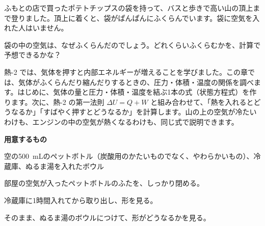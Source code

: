 
\begin{hatena}
\noindent\begin{minipage}[c]{0.58\linewidth}\raggedright
ふもとの店で買ったポテトチップスの袋を持って、バスと歩きで高い山の頂上まで登りました。頂上に着くと、袋がぱんぱんにふくらんでいます。袋に空気を入れた人はいません。

袋の中の空気は、なぜふくらんだのでしょう。どれくらいふくらむかを、計算で予想できるかな？
\end{minipage}\hfill
\begin{minipage}[c]{0.38\linewidth}\centering
{}
\end{minipage}
\end{hatena}

\noindent 熱-2 では、気体を押すと内部エネルギーが増えることを学びました。この章では、気体がふくらんだり縮んだりするときの、圧力・体積・温度の関係を調べます。はじめに、気体の量と圧力・体積・温度を結ぶ1本の式（状態方程式）を作ります。次に、熱-2 の第一法則 $\Delta U=Q+W$ と組み合わせて、「熱を入れるとどうなるか」「すばやく押すとどうなるか」を計算します。山の上の空気が冷たいわけも、エンジンの中の空気が熱くなるわけも、同じ式で説明できます。

\begin{yattemiyou}[ペットボトルを冷やしてみよう]
\textbf{用意するもの}\par
空の\qty{500}{mL}のペットボトル（炭酸用のかたいものでなく、やわらかいもの）、冷蔵庫、ぬるま湯を入れたボウル
\begin{enumerate}[label={\bkcircled[bkGreen]{\arabic*}}, leftmargin=2.4\zw, itemsep=1pt, topsep=2pt]
\item 部屋の空気が入ったペットボトルのふたを、しっかり閉める。
\item 冷蔵庫に1時間入れてから取り出し、形を見る。
\item そのまま、ぬるま湯のボウルにつけて、形がどうなるかを見る。
\end{enumerate}
\end{yattemiyou}

